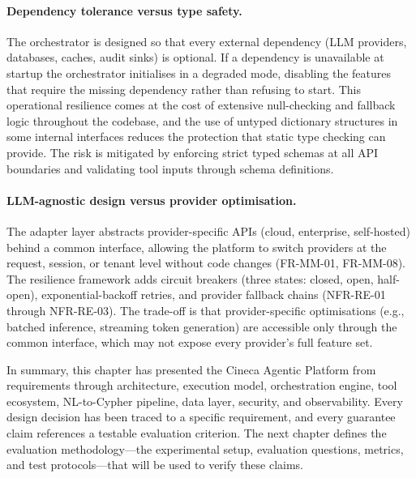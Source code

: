 \documentclass[a4paper]{sapthesis}
\begin{document}
\paragraph{Dependency tolerance versus type safety.}
The orchestrator is designed so that every external dependency (LLM
providers, databases, caches, audit sinks) is optional.  If a dependency
is unavailable at startup the orchestrator initialises in a degraded mode,
disabling the features that require the missing dependency rather than
refusing to start.  This operational resilience comes at the cost of
extensive null-checking and fallback logic throughout the codebase, and
the use of untyped dictionary structures in some internal interfaces
reduces the protection that static type checking can provide.  The risk
is mitigated by enforcing strict typed schemas at all API boundaries
and validating tool inputs through schema definitions.

\paragraph{LLM-agnostic design versus provider optimisation.}
The adapter layer abstracts provider-specific APIs (cloud, enterprise,
self-hosted) behind a common interface, allowing the platform to switch
providers at the request, session, or tenant level without code changes
(FR-MM-01, FR-MM-08).  The resilience framework adds circuit breakers
(three states: closed, open, half-open), exponential-backoff retries, and
provider fallback chains (NFR-RE-01 through NFR-RE-03).  The trade-off is
that provider-specific optimisations (e.g., batched inference, streaming
token generation) are accessible only through the common interface, which
may not expose every provider's full feature set.

\medskip
\noindent
In summary, this chapter has presented the Cineca Agentic Platform from
requirements through architecture, execution model, orchestration engine,
tool ecosystem, NL-to-Cypher pipeline, data layer, security, and
observability.  Every design decision has been traced to a specific
requirement, and every guarantee claim references a testable evaluation
criterion.  The next chapter defines the evaluation methodology---the
experimental setup, evaluation questions, metrics, and test protocols---that
will be used to verify these claims.

\end{document}
